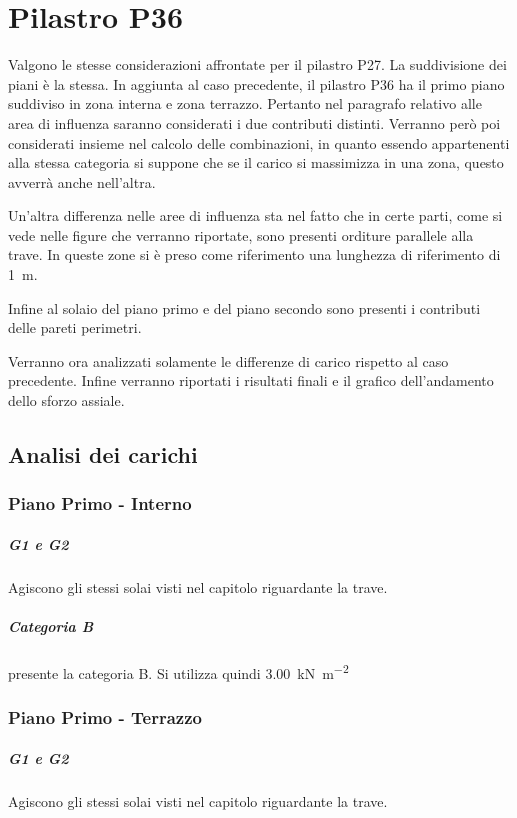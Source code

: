 \chapter{Pilastro P36}
Valgono le stesse considerazioni affrontate per il pilastro P27.
La suddivisione dei piani è la stessa. 
In aggiunta al caso precedente, il pilastro P36 ha il primo piano suddiviso in zona interna e zona terrazzo. 
Pertanto nel paragrafo relativo alle area di influenza saranno considerati i due contributi distinti.
Verranno però poi considerati insieme nel calcolo delle combinazioni, in quanto essendo appartenenti alla stessa categoria si suppone che se il carico si massimizza in una zona, questo avverrà anche nell'altra.

Un'altra differenza nelle aree di influenza sta nel fatto che in certe parti, come si vede nelle figure che verranno riportate, sono presenti orditure parallele alla trave.
In queste zone si è preso come riferimento una lunghezza di riferimento di \SI{1}{\meter}. 

Infine al solaio del piano primo e del piano secondo sono presenti i contributi delle pareti perimetri.

Verranno ora analizzati solamente le differenze di carico rispetto al caso precedente. 
Infine verranno riportati i risultati finali e il grafico dell'andamento dello sforzo assiale.

\section{Analisi dei carichi}
\subsection{Piano Primo - Interno}
\paragraph*{G1 e G2}  Agiscono gli stessi solai visti nel capitolo riguardante la trave. 
\paragraph*{Categoria B} \e presente la categoria B.
Si utilizza quindi \SI{3.00}{\kilo\newton\per\square\meter}
\subsection{Piano Primo - Terrazzo} 
\paragraph*{G1 e G2} Agiscono gli stessi solai visti nel capitolo riguardante la trave. 
